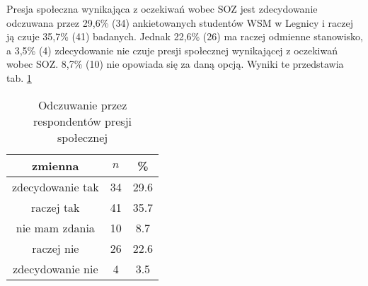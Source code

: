 
Presja społeczna wynikająca z oczekiwań wobec SOZ jest zdecydowanie odczuwana przez 29,6\%  (34) ankietowanych studentów WSM w Legnicy i raczej ją czuje  35,7\% (41) badanych. Jednak 22,6\% (26) ma  raczej odmienne stanowisko, a 3,5\% (4) zdecydowanie nie czuje presji społecznej wynikającej z oczekiwań wobec SOZ. 8,7\% (10) nie opowiada się za daną opcją. Wyniki te przedstawia tab. \ref{tab:Q15}

\begin{table}[H]
\caption{Odczuwanie przez respondentów presji społecznej}
\centering
\begin{tabular}{ | c | c | c |}
\hline
zmienna & $n$ & \% \\
\hline
zdecydowanie tak  &  34  & 29.6 \\
\hline
raczej tak  &  41  & 35.7 \\
\hline
nie mam zdania  &  10  & 8.7\\
\hline
raczej nie  &  26  & 22.6 \\
\hline
zdecydowanie nie  &  4  & 3.5\\
\hline
\end{tabular}
\label{tab:Q15}
\end{table}
